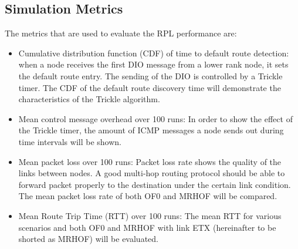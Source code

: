 \subsection{Simulation Metrics}
\label{Sim:metrics}
The metrics that are used to evaluate the RPL performance are:
\begin{itemize}
\item Cumulative distribution function (CDF) of time to default route detection: when a node receives the first DIO message from a lower rank node, it sets the default route entry. The sending of the DIO is controlled by a Trickle timer. The CDF of the default route discovery time will demonstrate the characteristics of the Trickle algorithm.
\newline

\item Mean control message overhead over 100 runs: In order to show the effect of the Trickle timer, the amount of ICMP messages a node sends out during time intervals will be shown.
\newline

\item Mean packet loss over 100 runs: Packet loss rate shows the quality of the links between nodes. A good multi-hop routing protocol should be able to forward packet properly to the destination under the certain link condition. The mean packet loss rate of both OF0 and MRHOF will be compared.
\newline

\item Mean Route Trip Time (RTT) over 100 runs: The mean RTT for various scenarios and both OF0 and MRHOF with link ETX (hereinafter to be shorted as MRHOF) will be evaluated.

\end{itemize}







